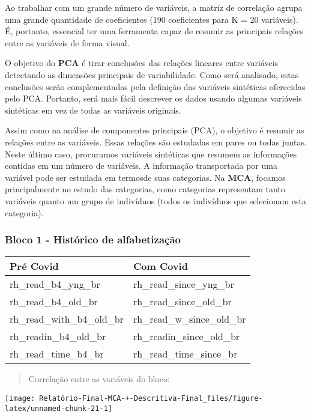 \documentclass[
]{article}
\begin{document}
Ao trabalhar com um grande número de variáveis, a matriz de correlação
agrupa uma grande quantidade de coeficientes (190 coeficientes para K =
20 variáveis). É, portanto, essencial ter uma ferramenta capaz de
resumir as principais relações entre as variáveis de forma visual.

O objetivo do \textbf{PCA} é tirar conclusões das relações lineares
entre variáveis detectando as dimensões principais de variabilidade.
Como será analisado, estas conclusões serão complementadas pela
definição das variáveis sintéticas oferecidas pelo PCA. Portanto, será
mais fácil descrever os dados usando algumas variáveis sintéticas em vez
de todas as variáveis originais.

Assim como na análise de componentes principais (PCA), o objetivo é
resumir as relações entre as variáveis. Essas relações são estudadas em
pares ou todas juntas. Neste último caso, procuramos variáveis
sintéticas que resumem as informações contidas em um número de
variáveis. A informação transportada por uma variável pode ser estudada
em termosde suas categorias. Na \textbf{MCA}, focamos principalmente no
estudo das categorias, como categorias representam tanto variáveis
quanto um grupo de indivíduos (todos os indivíduos que selecionam esta
categoria).

\hypertarget{bloco-1---histuxf3rico-de-alfabetizauxe7uxe3o}{%
\subsubsection{\texorpdfstring{\textbf{Bloco 1 - Histórico de
alfabetização}}{Bloco 1 - Histórico de alfabetização}}\label{bloco-1---histuxf3rico-de-alfabetizauxe7uxe3o}}

\begin{longtable}[]{@{}ll@{}}
\toprule
Pré Covid & Com Covid\tabularnewline
\midrule
\endhead
rh\_read\_b4\_yng\_br & rh\_read\_since\_yng\_br\tabularnewline
rh\_read\_b4\_old\_br & rh\_read\_since\_old\_br\tabularnewline
rh\_read\_with\_b4\_old\_br & rh\_read\_w\_since\_old\_br\tabularnewline
rh\_readin\_b4\_old\_br & rh\_readin\_since\_old\_br\tabularnewline
rh\_read\_time\_b4\_br & rh\_read\_time\_since\_br\tabularnewline
\bottomrule
\end{longtable}

\begin{quote}
Correlação entre as variáveis do bloco:
\end{quote}

\begin{center}\texttt{[image: Relatório-Final-MCA-+-Descritiva-Final\_files/figure-latex/unnamed-chunk-21-1]} \end{center}
\end{document}

